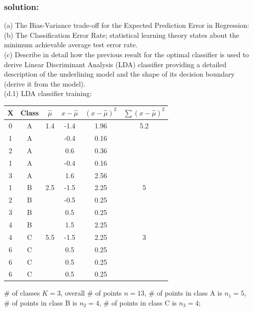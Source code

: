 \documentclass[a4paper,12pt,titlepage]{article} %
\begin{document}
\subsubsection{solution:}
(a) The Bias-Variance trade-off for the Expected Prediction Error in Regression:\\

(b) The Classification Error Rate;
statistical learning theory states about the minimum achievable average test error rate.\\

(c) Describe in detail how the previous result for the optimal classifier is used to derive Linear Discriminant Analysis (LDA) classifier providing a detailed description of the underlining model and the shape of its decision boundary (derive it from the model).\\

(d.1) LDA classifier training: 

\begin{center}
  \begin{tabular}{c|c||c|c|c|c}
    X & Class & $ \hat{\mu} $ & $ x - \hat{\mu} $ & $(x - \hat{\mu})^{2} $ & $ \sum{(x - \hat{\mu})^{2}} $\\
    \hline
    \hline
    0 & A & 1.4 & -1.4 & 1.96 & 5.2 \\
    1 & A &     & -0.4 & 0.16 &     \\
    2 & A &     &  0.6 & 0.36 &     \\
    1 & A &     & -0.4 & 0.16 &     \\
    3 & A &     &  1.6 & 2.56 &     \\
    \hline
    1 & B & 2.5 & -1.5 & 2.25 & 5 \\
    2 & B &     & -0.5 & 0.25 &   \\
    3 & B &     &  0.5 & 0.25 &   \\
    4 & B &     &  1.5 & 2.25 &   \\   
    \hline
    4 & C & 5.5 & -1.5 & 2.25 & 3 \\
    6 & C &     &  0.5 & 0.25 &   \\
    6 & C &     &  0.5 & 0.25 &   \\
    6 & C &     &  0.5 & 0.25 &   \\
    \hline
  \end{tabular}
\end{center}

\# of classes $ K= 3$, overall \# of points $ n = 13$, \# of points in class A is $ n_{1}= 5$, \# of points in class B is $ n_{2} = 4$, \# of points in class C is $ n_{3} = 4$;
\end{document}
